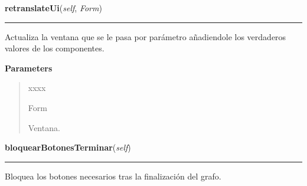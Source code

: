 \hspace{.8\funcindent}\begin{boxedminipage}{\funcwidth}

    \raggedright \textbf{retranslateUi}(\textit{self}, \textit{Form})

    \vspace{-1.5ex}

    \rule{\textwidth}{0.5\fboxrule}
\setlength{\parskip}{2ex}
    Actualiza la ventana que se le pasa por parámetro añadiendole los 
    verdaderos valores de los componentes.

\setlength{\parskip}{1ex}
      \textbf{Parameters}
      \vspace{-1ex}

      \begin{quote}
        \begin{Ventry}{xxxx}

          \item[Form]

          Ventana.

        \end{Ventry}

      \end{quote}

    \end{boxedminipage}

    \label{manejoGrafo:ManejoGrafo:bloquearBotonesTerminar}

    \vspace{0.5ex}

\hspace{.8\funcindent}\begin{boxedminipage}{\funcwidth}

    \raggedright \textbf{bloquearBotonesTerminar}(\textit{self})

    \vspace{-1.5ex}

    \rule{\textwidth}{0.5\fboxrule}
\setlength{\parskip}{2ex}
    Bloquea los botones necesarios tras la finalización del grafo.

\setlength{\parskip}{1ex}
    \end{boxedminipage}

    \label{manejoGrafo:ManejoGrafo:errorNoCategorias}

